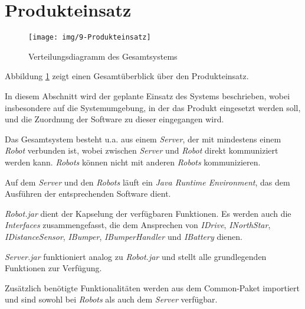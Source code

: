 \section{Produkteinsatz}

\begin{figure}[H]
\centering
\texttt{[image: img/9-Produkteinsatz]}
\caption{Verteilungsdiagramm des Gesamtsystems}
\label{ProdukteinsatzKomp}
\end{figure}

Abbildung \ref{ProdukteinsatzKomp} zeigt einen Gesamtüberblick über den Produkteinsatz.

In diesem Abschnitt wird der geplante Einsatz des Systems beschrieben, wobei insbesondere auf die Systemumgebung, in der das Produkt eingesetzt werden soll, und die Zuordnung der Software zu dieser eingegangen wird.

Das Gesamtsystem besteht u.a. aus einem \emph{Server}, der mit mindestens einem \emph{Robot} verbunden ist, wobei zwischen \emph{Server} und \emph{Robot} direkt kommuniziert werden kann. \emph{Robots} können nicht mit anderen \emph{Robots} kommunizieren.

Auf dem \emph{Server} und den \emph{Robots} läuft ein \emph{Java Runtime Environment}, das dem Ausführen der entsprechenden Software dient.

\emph{Robot.jar} dient der Kapselung der verfügbaren Funktionen. Es werden auch die \emph{Interfaces} zusammengefasst, die dem Ansprechen von \emph{IDrive}, \emph{INorthStar}, \emph{IDistanceSensor}, \emph{IBumper}, \emph{IBumperHandler} und \emph{IBattery} dienen.

\emph{Server.jar} funktioniert analog zu \emph{Robot.jar} und stellt alle grundlegenden Funktionen zur Verfügung.

Zusätzlich benötigte Funktionalitäten werden aus dem Common-Paket importiert und sind sowohl bei \emph{Robots} als auch dem \emph{Server} verfügbar.
